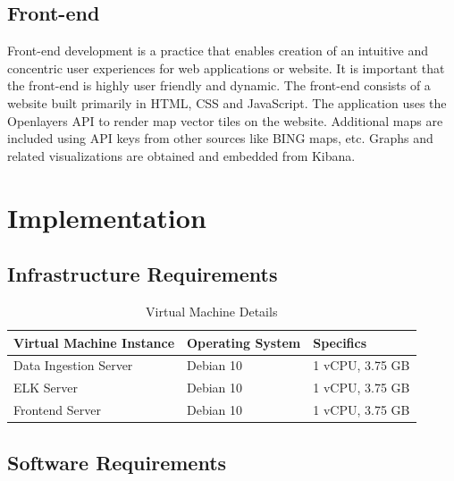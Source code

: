 \documentclass[]{report}
\begin{document}
\section{Front-end}
Front-end development is a practice that enables creation of an intuitive and concentric user experiences for web applications or website. It is important that the front-end is highly user friendly and dynamic. The front-end consists of a website built primarily in HTML, CSS and JavaScript. The application uses the Openlayers API to render map vector tiles on the website. Additional maps are included using API keys from other sources like BING maps, etc. Graphs and related visualizations are obtained and embedded from Kibana.


\chapter{Implementation}

\section{Infrastructure Requirements}

\begin{table}[ht]
\label{hardware}
\begin{center}
\begin{tabular} {l|l|l} %
\hline
\hline
\textbf{Virtual Machine Instance} & \textbf{Operating System} & \textbf{Specifics}  \\
\hline
Data Ingestion Server & Debian 10 & 1 vCPU, 3.75 GB \\
ELK Server & Debian 10 & 1 vCPU, 3.75 GB \\
Frontend Server & Debian 10 & 1 vCPU, 3.75 GB \\
\hline 
\hline
\end{tabular}
\end{center}
\caption{Virtual Machine Details}
\end{table}


\section{Software Requirements}
\end{document}
